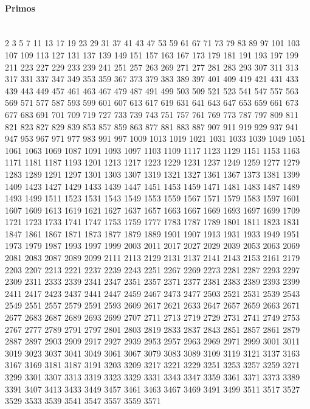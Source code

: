 \paragraph{Primos} \ \\
2 3 5 7 11 13 17 19 23 29
31 37 41 43 47 53 59 61 67 71
73 79 83 89 97 101 103 107 109 113
127 131 137 139 149 151 157 163 167 173
179 181 191 193 197 199 211 223 227 229
233 239 241 251 257 263 269 271 277 281
283 293 307 311 313 317 331 337 347 349
353 359 367 373 379 383 389 397 401 409
419 421 431 433 439 443 449 457 461 463
467 479 487 491 499 503 509 521 523 541
547 557 563 569 571 577 587 593 599 601
607 613 617 619 631 641 643 647 653 659
661 673 677 683 691 701 709 719 727 733
739 743 751 757 761 769 773 787 797 809
811 821 823 827 829 839 853 857 859 863
877 881 883 887 907 911 919 929 937 941
947 953 967 971 977 983 991 997 1009 1013
1019 1021 1031 1033 1039 1049 1051 1061 1063 1069
1087 1091 1093 1097 1103 1109 1117 1123 1129 1151
1153 1163 1171 1181 1187 1193 1201 1213 1217 1223
1229 1231 1237 1249 1259 1277 1279 1283 1289 1291
1297 1301 1303 1307 1319 1321 1327 1361 1367 1373
1381 1399 1409 1423 1427 1429 1433 1439 1447 1451
1453 1459 1471 1481 1483 1487 1489 1493 1499 1511
1523 1531 1543 1549 1553 1559 1567 1571 1579 1583
1597 1601 1607 1609 1613 1619 1621 1627 1637 1657
1663 1667 1669 1693 1697 1699 1709 1721 1723 1733
1741 1747 1753 1759 1777 1783 1787 1789 1801 1811
1823 1831 1847 1861 1867 1871 1873 1877 1879 1889
1901 1907 1913 1931 1933 1949 1951 1973 1979 1987
1993 1997 1999 2003 2011 2017 2027 2029 2039 2053
2063 2069 2081 2083 2087 2089 2099 2111 2113 2129
2131 2137 2141 2143 2153 2161 2179 2203 2207 2213
2221 2237 2239 2243 2251 2267 2269 2273 2281 2287
2293 2297 2309 2311 2333 2339 2341 2347 2351 2357
2371 2377 2381 2383 2389 2393 2399 2411 2417 2423
2437 2441 2447 2459 2467 2473 2477 2503 2521 2531
2539 2543 2549 2551 2557 2579 2591 2593 2609 2617
2621 2633 2647 2657 2659 2663 2671 2677 2683 2687
2689 2693 2699 2707 2711 2713 2719 2729 2731 2741
2749 2753 2767 2777 2789 2791 2797 2801 2803 2819
2833 2837 2843 2851 2857 2861 2879 2887 2897 2903
2909 2917 2927 2939 2953 2957 2963 2969 2971 2999
3001 3011 3019 3023 3037 3041 3049 3061 3067 3079
3083 3089 3109 3119 3121 3137 3163 3167 3169 3181
3187 3191 3203 3209 3217 3221 3229 3251 3253 3257
3259 3271 3299 3301 3307 3313 3319 3323 3329 3331
3343 3347 3359 3361 3371 3373 3389 3391 3407 3413
3433 3449 3457 3461 3463 3467 3469 3491 3499 3511
3517 3527 3529 3533 3539 3541 3547 3557 3559 3571
\\
